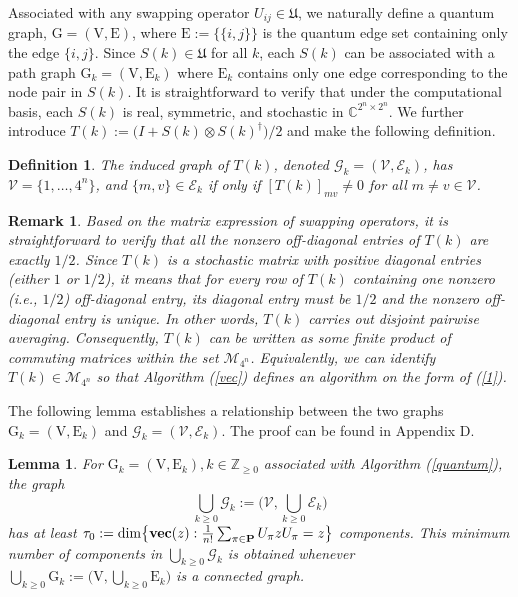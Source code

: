 \documentclass[a4paper, 11pt]{article}
\newtheorem{definition}{Definition}
\newtheorem{lemma}{Lemma}
\newtheorem{remark}{Remark}
\begin{document}
Associated with  any swapping operator $U_{ij}\in \mathfrak{U}$, we naturally define a quantum  graph, $\mathrm{G}=(\mathrm{V}, \mathrm{E})$, where $\mathrm{E}:=\big\{ \{i,j\}\big\}$ is the quantum edge set containing {only the} edge $\{i,j\}$. Since ${S(k)}\in \mathfrak{U}$ for all $k$, {each $S(k)$ can be associated with a  path graph}  $\mathrm{G}_k=(\mathrm{V}, \mathrm{E}_k)$ where $\mathrm{E}_k$ contains only one edge corresponding to the node pair in $S(k)$. {It is straightforward to verify that under the computational basis, each $S(k)$ is real, symmetric, and stochastic in $\mathbb{C}^{2^n\times 2^n}$. We further introduce $T(k):=\big(I+ S(k)\otimes S(k)^\dag \big)/2$ and make the following definition.}

\medskip

\begin{definition}
The induced graph of $T(k)$, denoted $\mathcal{G}_k=(\mathcal{V}, \mathcal{E}_k)$, {has} $\mathcal{V}=\{1,\dots,4^n\}$, and $\{m,v\}\in \mathcal{E}_k$ if only if $[T(k)]_{mv}\neq 0$ for all $m\neq v\in \mathcal{V}$.
\end{definition}

\medskip



\begin{remark}\label{remark-Tk}
Based on the matrix expression of swapping operators, it is straightforward to verify that all the nonzero  off-diagonal entries of $T(k)$ are exactly $1/2$. Since $T(k)$ is a stochastic matrix with positive diagonal entries (either $1$ or $1/2$), it means that for every row of $T(k)$ containing one nonzero (i.e., $1/2$) off-diagonal entry, its diagonal entry must be $1/2$ and the nonzero off-diagonal entry is unique. In other words, $T(k)$ carries out disjoint pairwise averaging. Consequently, $T(k)$ can be written as some finite product of  commuting  matrices within the set $ \mathscr{M}_{4^n}$. Equivalently, we can identify $T(k)\in  \mathscr{M}_{4^n}$ so that Algorithm (\ref{vec}) defines an algorithm on the form of (\ref{1}).
\end{remark}



The following lemma establishes a relationship between the two graphs $\mathrm{G}_k=(\mathrm{V}, \mathrm{E}_k)$ and  $\mathcal{G}_k=(\mathcal{V}, \mathcal{E}_k)$. The proof can be found in Appendix D.

\medskip

\begin{lemma}\label{lempartition}
For $\mathrm{G}_k=(\mathrm{V}, \mathrm{E}_k),k\in \mathbb{Z}_{\geq0}$ associated with Algorithm (\ref{quantum}), the graph $$
\bigcup_{k\geq 0}\mathcal{G}_k:= \Big(\mathcal{V}, \bigcup_{k\geq 0}\mathcal{E}_k \Big)
$$
has at least $\tau_0:={\rm dim} \big\{{\rm \bf vec}(z):  \frac{1}{n!} \sum_{\pi \in \mathbf{P}} U_\pi z U_\pi  =z\big\}$ components. This minimum number of {components in} $\bigcup_{k\geq 0}\mathcal{G}_k$ is {obtained} whenever  $\bigcup_{k\geq 0}\mathrm{G}_k:= \Big(\mathrm{V}, \bigcup_{k\geq 0}\mathrm{E}_k \Big)$ is a connected graph.
\end{lemma}
\end{document}
